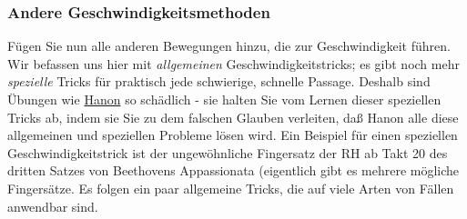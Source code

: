\subsubsection{Andere Geschwindigkeitsmethoden}
\label{c1iii7iAndere}

Fügen Sie nun alle anderen Bewegungen hinzu, die zur Geschwindigkeit führen.
Wir befassen uns hier mit \textit{allgemeinen} Geschwindigkeitstricks; es gibt noch mehr \textit{spezielle} Tricks für praktisch jede schwierige, schnelle Passage.
Deshalb sind Übungen wie \hyperref[c1iii7h]{Hanon} so schädlich - sie halten Sie vom Lernen dieser speziellen Tricks ab, indem sie Sie zu dem falschen Glauben verleiten, daß Hanon alle diese allgemeinen und speziellen Probleme lösen wird.
Ein Beispiel für einen speziellen Geschwindigkeitstrick ist der ungewöhnliche Fingersatz der RH ab Takt 20 des dritten Satzes von Beethovens Appassionata (eigentlich gibt es mehrere mögliche Fingersätze.
Es folgen ein paar allgemeine Tricks, die auf viele Arten von Fällen anwendbar sind.

